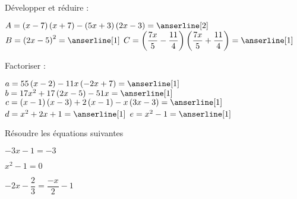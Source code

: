 \documentclass[a4paper,addpoints,12pt]{exam}
\begin{document}
\devoir[sem=2,prv=false,ds=true,num=4 ,niv=2 ,date=06/03/2023]

\begin{exo}[6]
\begin{questions}
\question Développer et réduire :

\(
A=\left(x-7\right)\left(x+7\right)-\left(5x+3\right)\left(2x-3\right)=\anserline[2]
\)
\(
B=\left(2x-5\right)^{2}=\anserline[1]
\)
\(
C=\left(\dfrac{7x}{5}-\dfrac{11}{4}\right)\left(\dfrac{7x}{5}+\dfrac{11}{4}\right)=\anserline[1]
\)
\end{questions}
\end{exo}

\begin{exo}[8]
\begin{questions}
\question Factoriser :

\(
a=55\left(x-2\right)-11x\left(-2x+7\right)=\anserline[1]
\)
\(
b=17x^{2}+17\left(2x-5\right)-51x=\anserline[1]
\)
\(
c=\left(x-1\right)\left(x-3\right)+2\left(x-1\right)-x\left(3x-3\right)=\anserline[1]
\)
\(
d=x^{2}+2x+1=\anserline[1]
\)
\(
e=x^{2}-1=\anserline[1]
\)
\end{questions}
\end{exo}

\begin{exo}[6]
\begin{questions}
\question Résoudre les équations suivantes 
\end{questions}
\begin{multicols}{3}
\(-3x-1=-3\)\newline
\anserline[4]
\columnbreak

\(x^{2}-1=0\)\newline
\anserline[4]
\columnbreak

\(-2x-\dfrac{2}{3}=\dfrac{-x}{2}-1\)\newline
\anserline[4]
\end{multicols}
\end{exo}
\end{document}
